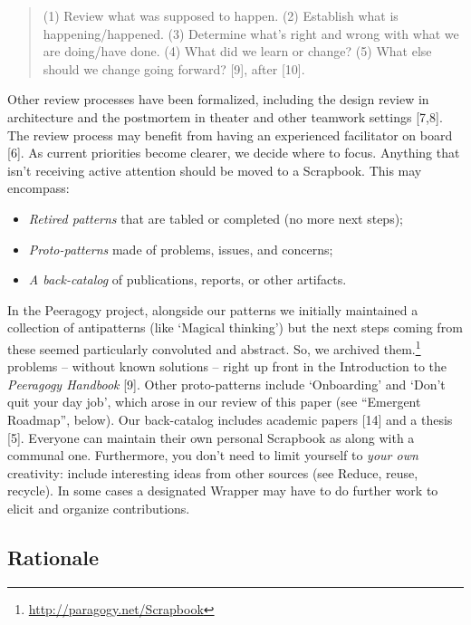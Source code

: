 \begin{quote}
(1) Review what was supposed to happen. (2) Establish what is
happening/happened. (3) Determine what's right and wrong with what we
are doing/have done. (4) What did we learn or change? (5) What else
should we change going forward? {{[}9{]}}, after {{[}10{]}}.
\end{quote}

Other review processes have been formalized, including the design review
in architecture and the postmortem in theater and other teamwork
settings {{[}7,8{]}}. The review process may benefit from having an
experienced facilitator on board {{[}6{]}}. As current priorities become
clearer, we decide where to focus. Anything that isn't receiving active
attention should be moved to a {{Scrapbook}}. This may encompass:

\begin{itemize}
\tightlist
\item
  \emph{Retired patterns} that are tabled or completed (no more next
  steps);
\item
  \emph{Proto-patterns} made of problems, issues, and concerns;
\item
  \emph{A back-catalog} of publications, reports, or other artifacts.
\end{itemize}

In the Peeragogy project, alongside our patterns we initially maintained
a collection of antipatterns (like `{{Magical thinking}}') but the next
steps coming from these seemed particularly convoluted and abstract. So,
we archived them.\footnote{\url{http://paragogy.net/Scrapbook}} problems
-- without known solutions -- right up front in the Introduction to the
\emph{Peeragogy Handbook} {{[}9{]}}. Other proto-patterns include
`{{Onboarding}}' and `{{Don't quit your day job}}', which arose in our
review of this paper (see ``Emergent Roadmap'', below). Our back-catalog
includes academic papers {{[}14{]}} and a thesis {{[}5{]}}. Everyone can
maintain their own personal {{Scrapbook}} as along with a communal one.
Furthermore, you don't need to limit yourself to \emph{your own}
creativity: include interesting ideas from other sources (see {{Reduce,
reuse, recycle}}). In some cases a designated {{Wrapper}} may have to do
further work to elicit and organize contributions.

\hypertarget{rationale}{%
\subsection{Rationale}\label{rationale}}

